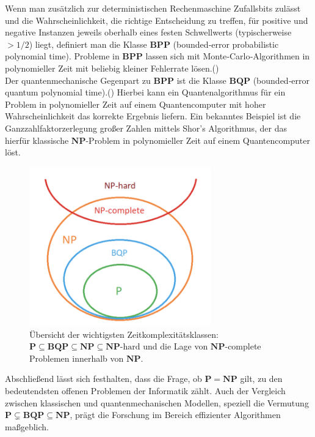 Wenn man zusätzlich zur deterministischen Rechenmaschine Zufallsbits zulässt und die Wahrscheinlichkeit, die richtige Entscheidung zu treffen, für positive und negative Instanzen jeweils oberhalb eines festen Schwellwerts (typischerweise \(>1/2\)) liegt, definiert man die Klasse \(\mathbf{BPP}\) (bounded‑error probabilistic polynomial time). Probleme in \(\mathbf{BPP}\) lassen sich mit Monte‑Carlo‑Algorithmen in polynomieller Zeit mit beliebig kleiner Fehlerrate lösen.(\cite{zotero-1212}) \\

Der quantenmechanische Gegenpart zu \(\mathbf{BPP}\) ist die Klasse \(\mathbf{BQP}\) (bounded‑error quantum polynomial time).(\cite{zotero-1212}) Hierbei kann ein Quantenalgorithmus für ein Problem in polynomieller Zeit auf einem Quantencomputer mit hoher Wahrscheinlichkeit das korrekte Ergebnis liefern. Ein bekanntes Beispiel ist die Ganzzahlfaktorzerlegung großer Zahlen mittels Shor’s Algorithmus, der das hierfür klassische \(\mathbf{NP}\)-Problem in polynomieller Zeit auf einem Quantencomputer löst.

\begin{figure}[h]
  \centering
  \includegraphics[width=0.7\textwidth]{images/basic-algorithms/problem-classes.png}
  \caption{Übersicht der wichtigsten Zeitkomplexitätsklassen: \(\mathbf{P}\subseteq \mathbf{BQP}\subseteq \mathbf{NP}\subseteq \mathbf{NP}\text{-hard}\) und die Lage von \(\mathbf{NP}\)-complete Problemen innerhalb von \(\mathbf{NP}\).}
  \label{fig:problem_classes}
\end{figure}

Abschließend lässt sich festhalten, dass die Frage, ob \(\mathbf{P}=\mathbf{NP}\) gilt, zu den bedeutendsten offenen Problemen der Informatik zählt. Auch der Vergleich zwischen klassischen und quantenmechanischen Modellen, speziell die Vermutung \(\mathbf{P}\subsetneq \mathbf{BQP}\subseteq \mathbf{NP}\), prägt die Forschung im Bereich effizienter Algorithmen maßgeblich.
\printbibliography

